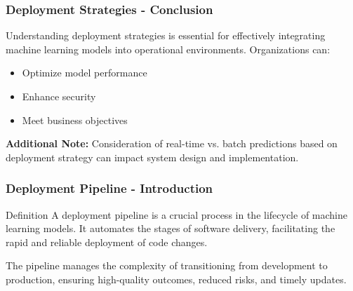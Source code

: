 \documentclass[aspectratio=169]{beamer}
\begin{document}
\begin{frame}[fragile]
    \frametitle{Deployment Strategies - Conclusion}
    Understanding deployment strategies is essential for effectively integrating machine learning models into operational environments. 
    Organizations can:
    \begin{itemize}
        \item Optimize model performance
        \item Enhance security
        \item Meet business objectives
    \end{itemize}

    \textbf{Additional Note:} Consideration of real-time vs. batch predictions based on deployment strategy can impact system design and implementation.
\end{frame}

\begin{frame}[fragile]
    \frametitle{Deployment Pipeline - Introduction}
    \begin{block}{Definition}
        A deployment pipeline is a crucial process in the lifecycle of machine learning models. It automates the stages of software delivery, facilitating the rapid and reliable deployment of code changes.
    \end{block}
    The pipeline manages the complexity of transitioning from development to production, ensuring high-quality outcomes, reduced risks, and timely updates.
\end{frame}
\end{document}
